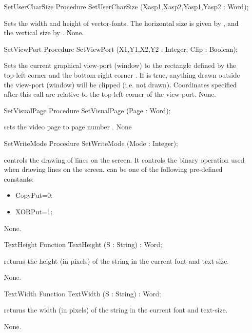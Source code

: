 \begin{procedure}{SetUserCharSize}
\Declaration
Procedure SetUserCharSize (Xasp1,Xasp2,Yasp1,Yasp2 : Word);

\Description
Sets the width and height of vector-fonts. The horizontal size is given
by , and the vertical size by .
\Errors
None.
\SeeAlso
{}
\end{procedure}
\begin{procedure}{SetViewPort}
\Declaration
Procedure SetViewPort (X1,Y1,X2,Y2 : Integer; Clip : Boolean);

\Description
Sets the current graphical view-port (window) to the rectangle defined by
the top-left corner  and the bottom-right corner .
If  is true, anything drawn outside the view-port (window) will be
clipped (i.e. not drawn). Coordinates specified after this call are relative
to the top-left corner of the view-port.
\Errors
None.
\SeeAlso
{}
\end{procedure}
\begin{procedure}{SetVisualPage}
\Declaration
Procedure SetVisualPage (Page : Word);

\Description
{} sets the video page to page number . 
\Errors
None
\SeeAlso
{}
\end{procedure}
\begin{procedure}{SetWriteMode}
\Declaration
Procedure SetWriteMode (Mode : Integer);

\Description
{} controls the drawing of lines on the screen. It controls
the binary operation used when drawing lines on the screen.  can
be one of the following pre-defined constants:
\begin{itemize}
\item CopyPut=0;
\item XORPut=1;
\end{itemize}
\Errors
None.
\SeeAlso

\end{procedure}
\begin{function}{TextHeight}
\Declaration
Function TextHeight (S : String) : Word;

\Description
{} returns the height (in pixels) of the string  in
the current font and text-size.

\Errors
None.
\SeeAlso
{}
\end{function}
\begin{function}{TextWidth}
\Declaration
Function TextWidth (S : String) : Word;

\Description
{} returns the width (in pixels) of the string  in
the current font and text-size.

\Errors
None.
\SeeAlso
{}
\end{function}
                                                                                                                                                                                                                                                               
